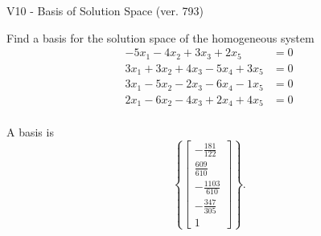 \begin{exercise}
  \begin{exerciseTitle}V10 - Basis of Solution Space (ver. 793)\end{exerciseTitle}
  \begin{exerciseStatement}
    Find a basis for the solution space of the homogeneous system 
\begin{align*}
 -5 x_ 1 -4 x_ 2 + 3 x_ 3 + 2 x_ 5 &= 0  \\ 
  3 x_ 1 + 3 x_ 2 + 4 x_ 3 -5 x_ 4 + 3 x_ 5 &= 0  \\ 
  3 x_ 1 -5 x_ 2 -2 x_ 3 -6 x_ 4 -1 x_ 5 &= 0  \\ 
  2 x_ 1 -6 x_ 2 -4 x_ 3 + 2 x_ 4 + 4 x_ 5 &= 0  \\ 
 \end{align*}


 
  \end{exerciseStatement}

  \begin{exerciseAnswer}
   A basis is   
\[\left\{\left[\begin{array}{c}
-\frac{181}{122} \\
\frac{609}{610} \\
-\frac{1103}{610} \\
-\frac{347}{305} \\
1
\end{array}\right]\right\}.\]

  


  \end{exerciseAnswer}
\end{exercise}